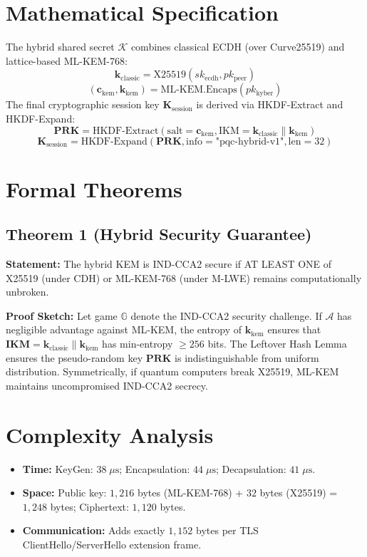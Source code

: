 \documentclass[10pt,journal,compsoc]{IEEEtran}
\begin{document}
\section{Mathematical Specification}
The hybrid shared secret $\mathcal{K}$ combines classical ECDH (over Curve25519) and lattice-based ML-KEM-768:
$$\mathbf{k}_{\text{classic}} = \text{X25519}(sk_{\text{ecdh}}, pk_{\text{peer}})$$
$$(\mathbf{c}_{\text{kem}}, \mathbf{k}_{\text{kem}}) = \text{ML-KEM.Encaps}(pk_{\text{kyber}})$$
The final cryptographic session key $\mathbf{K}_{\text{session}}$ is derived via HKDF-Extract and HKDF-Expand:
$$\mathbf{PRK} = \text{HKDF-Extract}\left( \text{salt}=\mathbf{c}_{\text{kem}}, \text{IKM}=\mathbf{k}_{\text{classic}} \parallel \mathbf{k}_{\text{kem}} \right)$$
$$\mathbf{K}_{\text{session}} = \text{HKDF-Expand}\left( \mathbf{PRK}, \text{info}=\text{"pqc-hybrid-v1"}, \text{len}=32 \right)$$

\section{Formal Theorems}
\subsection{Theorem 1 (Hybrid Security Guarantee)}
\textbf{Statement:} The hybrid KEM is IND-CCA2 secure if AT LEAST ONE of X25519 (under CDH) or ML-KEM-768 (under M-LWE) remains computationally unbroken.

\textbf{Proof Sketch:} Let game $\mathbb{G}$ denote the IND-CCA2 security challenge. If $\mathcal{A}$ has negligible advantage against ML-KEM, the entropy of $\mathbf{k}_{\text{kem}}$ ensures that $\mathbf{IKM} = \mathbf{k}_{\text{classic}} \parallel \mathbf{k}_{\text{kem}}$ has min-entropy $\ge 256$ bits. The Leftover Hash Lemma ensures the pseudo-random key $\mathbf{PRK}$ is indistinguishable from uniform distribution. Symmetrically, if quantum computers break X25519, ML-KEM maintains uncompromised IND-CCA2 secrecy.


\section{Complexity Analysis}
\begin{itemize}
  \item \textbf{Time:} KeyGen: $38\;\mu\text{s}$; Encapsulation: $44\;\mu\text{s}$; Decapsulation: $41\;\mu\text{s}$.
  \item \textbf{Space:} Public key: $1,\!216$ bytes (ML-KEM-768) + $32$ bytes (X25519) = $1,\!248$ bytes; Ciphertext: $1,\!120$ bytes.
  \item \textbf{Communication:} Adds exactly $1,\!152$ bytes per TLS ClientHello/ServerHello extension frame.
\end{itemize}
\end{document}
